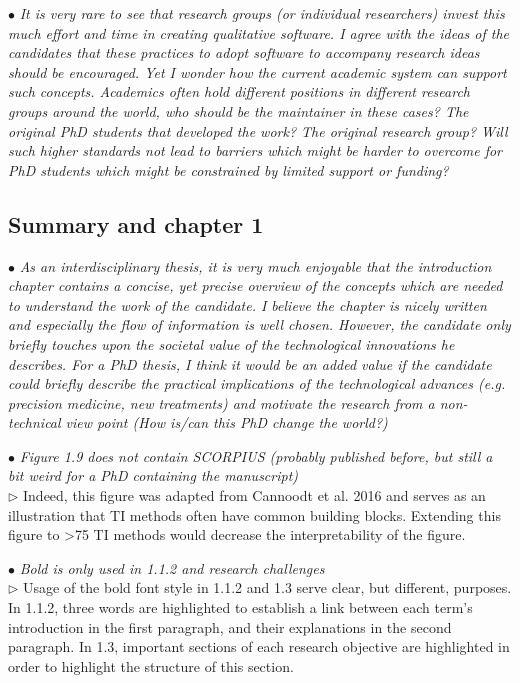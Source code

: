 \documentclass[10pt]{article}
\newcommand{\exam}[2][\  ]{\hspace{0pt}\marginpar{\color{red}#1}$\bullet$ \textit{#2}}
\newcommand{\imp}[1]{{\color{red} #1}}
\newcommand{\nimp}[1]{{\color{gray} #1}}
\newcommand{\answ}[1]{{\color{blue} $\triangleright$ #1}}
\newcommand{\bigexclaim}{\raisebox{-0.1em}{\BigTriangleUp}\hspace{-0.32em}\llap{\small\textbf{!}}\hspace{0.32em}}
\newcommand{\tagimp}{\bigexclaim}
\newcommand{\tagtime}{{\Large $\hourglass$}}
\begin{document}
{{\exam[\tagimp]{\nimp{It is very rare to see that research groups (or individual researchers) invest this
	much effort and time in creating qualitative software. I agree with the ideas of
	the candidates that these practices to adopt software to accompany research
	ideas should be encouraged.} Yet I wonder how the current academic system
	can support such concepts. Academics often hold different positions in
	different research groups around the world, who should be the maintainer in
	these cases? The original PhD students that developed the work? The original
	research group? Will such higher standards not lead to barriers which might
	be harder to overcome for PhD students which might be constrained by limited
	support or funding?}


\subsection{Summary and chapter 1}

\exam[\tagimp \tagtime]{\nimp{As an interdisciplinary thesis, it is very much enjoyable that the introduction
	chapter contains a concise, yet precise overview of the concepts which are
	needed to understand the work of the candidate. I believe the chapter is nicely
	written and especially the flow of information is well chosen. However, the
	candidate only briefly touches upon the societal value of the technological
	innovations he describes. For a PhD thesis, } \imp{I think it would be an added value
	if the candidate could briefly describe the practical implications of the
	technological advances (e.g. precision medicine, new treatments) and
	motivate the research from a non-technical view point (How is/can this PhD
	change the world?)}}



\exam{Figure 1.9 does not contain SCORPIUS (probably published before,
	but still a bit weird for a PhD containing the manuscript)} \\
\answ{Indeed, this figure was adapted from Cannoodt et al. 2016 and serves as an illustration that
TI methods often have common building blocks. Extending this figure to >75 TI methods would decrease the interpretability of the figure.}

\exam{Bold is only used in 1.1.2 and research challenges} \\
\answ{Usage of the bold font style in 1.1.2 and 1.3 serve clear, but different, purposes. In 1.1.2, three words are highlighted to establish a link between each term's introduction in the first paragraph, and their explanations in the second paragraph. In 1.3, important sections of each research objective are highlighted in order to highlight the structure of this section.}

}}
\end{document}
